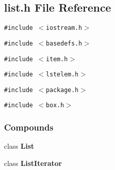 \subsection{list.h File Reference}
\label{list.h}
{\tt \#include $<$iostream.h$>$}\par
{\tt \#include $<$basedefs.h$>$}\par
{\tt \#include $<$item.h$>$}\par
{\tt \#include $<$lstelem.h$>$}\par
{\tt \#include $<$package.h$>$}\par
{\tt \#include $<$box.h$>$}\par
\subsubsection*{Compounds}
\begin{CompactItemize}
\item 
class {\bf List}
\item 
class {\bf List\-Iterator}
\end{CompactItemize}
